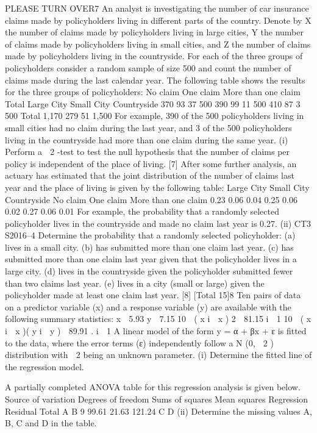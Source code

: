 \documentclass[a4paper,12pt]{article}
\begin{document}
\begin{enumerate}
PLEASE TURN OVER7
An analyst is investigating the number of car insurance claims made by policyholders
living in different parts of the country. Denote by X the number of claims made by
policyholders living in large cities, Y the number of claims made by policyholders
living in small cities, and Z the number of claims made by policyholders living in the
countryside. For each of the three groups of policyholders consider a random sample
of size 500 and count the number of claims made during the last calendar year.
The following table shows the results for the three groups of policyholders:
No claim
One claim
More than one claim
Total
Large City Small City Countryside
370
93
37
500 390
99
11
500 410
87
3
500
Total
1,170
279
51
1,500
For example, 390 of the 500 policyholders living in small cities had no claim during
the last year, and 3 of the 500 policyholders living in the countryside had more than
one claim during the same year.
(i)
Perform a  2 -test to test the null hypothesis that the number of claims per
policy is independent of the place of living.
[7]
After some further analysis, an actuary has estimated that the joint distribution of the
number of claims last year and the place of living is given by the following table:
Large City Small City Countryside
No claim
One claim
More than one claim
0.23
0.06
0.04
0.25
0.06
0.02
0.27
0.06
0.01
For example, the probability that a randomly selected policyholder lives in the
countryside and made no claim last year is 0.27.
(ii)
CT3 S2016–4
Determine the probability that a randomly selected policyholder:
(a) lives in a small city.
(b) has submitted more than one claim last year.
(c) has submitted more than one claim last year given that the policyholder
lives in a large city.
(d) lives in the countryside given the policyholder submitted fewer than
two claims last year.
(e) lives in a city (small or large) given the policyholder made at least one
claim last year.
[8]
[Total 15]8
Ten pairs of data on a predictor variable (x) and a response variable (y) are available
with the following summary statistics:
x  5.93 y  7.15
10
 ( x i  x ) 2  81.15
i  1
10
 ( x i  x )( y i  y )  89.91 .
i  1
A linear model of the form y = α + βx + ε is fitted to the data, where the error
terms (ε) independently follow a N (0,  2 ) distribution with  2 being an unknown
parameter.
(i)
Determine the fitted line of the regression model.

A partially completed ANOVA table for this regression analysis is given below.
Source of
variation Degrees of
freedom Sums of
squares Mean
squares
Regression
Residual
Total A
B
9 99.61
21.63
121.24 C
D
(ii) Determine the missing values A, B, C and D in the table.


\end{enumerate}
\end{document}
